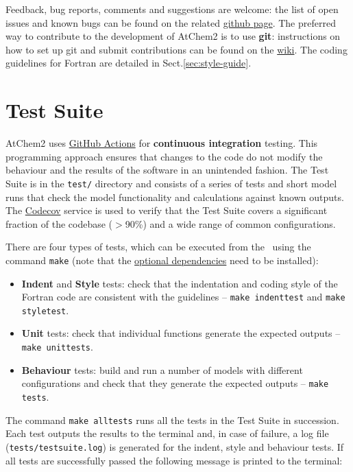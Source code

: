 Feedback, bug reports, comments and suggestions are welcome: the list
of open issues and known bugs can be found on the related
\href{https://github.com/AtChem/AtChem2/issues}{github page}. The
preferred way to contribute to the development of AtChem2 is to use
\textbf{git}: instructions on how to set up git and submit
contributions can be found on the
\href{https://github.com/AtChem/AtChem2/wiki/How-to-contribute}{wiki}.
The coding guidelines for Fortran are detailed in Sect.\ref{sec:style-guide}.

\section{Test Suite} \label{sec:test-suite}

AtChem2 uses \href{https://github.com/features/actions/}{GitHub Actions} for
\textbf{continuous integration} testing. This programming approach
ensures that changes to the code do not modify the behaviour and the
results of the software in an unintended fashion. The Test Suite is in
the \texttt{test/} directory and consists of a series of tests and
short model runs that check the model functionality and calculations
against known outputs. The \href{https://codecov.io/}{Codecov} service
is used to verify that the Test Suite covers a significant fraction of
the codebase ($>$90\%) and a wide range of common configurations.

There are four types of tests, which can be executed from the
\maindir\ using the command \verb|make| (note that the
\hyperref[subsec:optional-dependencies]{optional dependencies} need to
be installed):

\begin{itemize}
\item \textbf{Indent} and \textbf{Style} tests: check that the
  indentation and coding style of the Fortran code are consistent with
  the guidelines -- \verb|make indenttest| and \verb|make styletest|.
\item \textbf{Unit} tests: check that individual functions generate
  the expected outputs -- \verb|make unittests|.
\item \textbf{Behaviour} tests: build and run a number of models with
  different configurations and check that they generate the expected
  outputs -- \verb|make tests|.
\end{itemize}

The command \verb|make alltests| runs all the tests in the Test Suite
in succession. Each test outputs the results to the terminal and, in
case of failure, a log file (\texttt{tests/testsuite.log}) is
generated for the indent, style and behaviour tests. If all tests are
successfully passed the following message is printed to the terminal:

